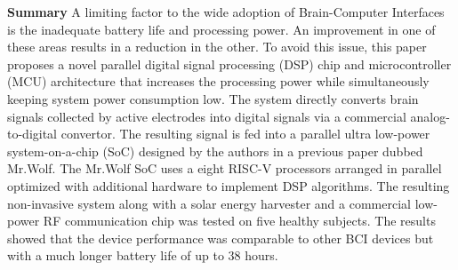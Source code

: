 \noindent
\textbf{Summary} A limiting factor to the wide adoption of Brain-Computer Interfaces is the inadequate battery life and processing power. An improvement in one of these areas results in a reduction in the other. To avoid this issue, this paper proposes a novel parallel digital signal processing (DSP) chip and microcontroller (MCU) architecture that increases the processing power while simultaneously keeping system power consumption low. The system directly converts brain signals collected by active electrodes into digital signals via a commercial analog-to-digital convertor. The resulting signal is fed into a parallel ultra low-power system-on-a-chip (SoC) designed by the authors in a previous paper dubbed Mr.Wolf. The Mr.Wolf SoC uses a eight RISC-V processors arranged in parallel optimized with additional hardware to implement DSP algorithms. The resulting non-invasive system along with a solar energy harvester and a commercial low-power RF communication chip was tested on five healthy subjects. The results showed that the device performance was comparable to other BCI devices but with a much longer battery life of up to 38 hours. \\ \\